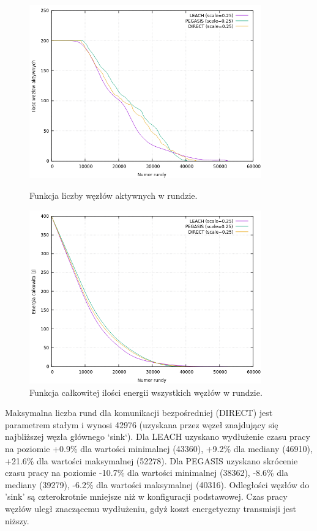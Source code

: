 \documentclass[a4paper,12pt,twoside,openany]{report}
\begin{document}
\begin{figure}[H]
 \centering
 \includegraphics[width=10cm]{images/gnuplot/test_3/nodes_in_round_xy050.png}
 \caption{Funkcja liczby węzłów aktywnych w rundzie.}
 \includegraphics[width=10cm]{images/gnuplot/test_3/energy_in_round_xy050.png}
 \caption{Funkcja całkowitej ilości energii wszystkich węzłów w rundzie.}
\end{figure}

\par
Maksymalna liczba rund dla komunikacji bezpośredniej (DIRECT) jest parametrem stałym i wynosi 42976 (uzyskana przez węzeł znajdujący się najbliższej węzła głównego `sink`).
Dla LEACH uzyskano wydłużenie czasu pracy na poziomie +0.9\% dla wartości minimalnej (43360), +9.2\% dla mediany (46910), +21.6\% dla wartości maksymalnej (52278).
Dla PEGASIS uzyskano skrócenie czasu pracy na poziomie -10.7\% dla wartości minimalnej (38362), -8.6\% dla mediany (39279), -6.2\% dla wartości maksymalnej (40316).
Odległości węzłów do 'sink' są czterokrotnie mniejsze niż w konfiguracji podstawowej. Czas pracy węzłów uległ znaczącemu wydłużeniu, gdyż koszt energetyczny transmisji jest niższy.
\end{document}

